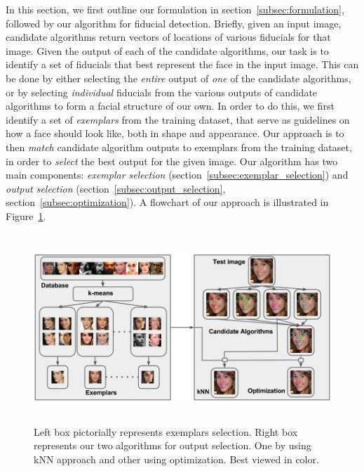 \label{sec:face_fiducial_detection}
In this section, we first outline our formulation in section~\ref{subsec:formulation}, followed 
by our algorithm for fiducial detection.
Briefly, given an input image, candidate algorithms return vectors of locations of
various fiducials for that image. Given the output of each of the candidate algorithms, our task
is to identify a set of fiducials that best represent the face in the input image. This can be done
by either selecting the \emph{entire} output of \emph{one} of the candidate algorithms, or by
selecting \emph{individual} fiducials from the various outputs of candidate algorithms to form a facial
structure of our own. In order to do this, we first identify a set of \emph{exemplars} from the
training dataset, that serve as guidelines on how a face should look like, both in shape and
appearance. Our approach is to then \emph{match} candidate algorithm outputs to exemplars from the
training dataset, in order to \emph{select} the best output for the given image.
Our algorithm has two main components: \emph{exemplar selection} (section~\ref{subsec:exemplar_selection}) and
\emph{output selection} (section~\ref{subsec:output_selection}, section~\ref{subsec:optimization}). A flowchart of our approach
is illustrated in Figure~\ref{fig:outline}.

\begin{figure}
  \centering
\includegraphics[width=6.0in, height=2.8in]{fid/figures/method.png}
\caption{Left box pictorially represents exemplars selection. Right box represents our two algorithms for output selection. One by using kNN approach and other using optimization. Best viewed in color.}
\label{fig:outline}
\end{figure}


